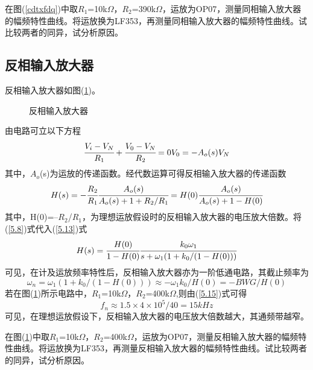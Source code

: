 \documentclass[a4paper]{article}
\begin{document}
在图(\ref{cdtxfdq})中取$R_1$=10k$\Omega$，$R_2$=390k$\Omega$，运放为OP07，测量同相输入放大器的幅频特性曲线。将运放换为LF353，再测量同相输入放大器的幅频特性曲线。试比较两者的同异，试分析原因。

\subsection{反相输入放大器}
反相输入放大器如图(\ref{cdfxfdq})。
\begin{figure}[!h]
\centering
{}
\caption{反相输入放大器}\label{cdfxfdq}
\end{figure}
由电路可立以下方程
\begin{equation}
\cfrac{V_i - V_N}{R_1} + \cfrac{V_0 - V_N}{R_2} = 0\\
V_0 = -A_o(s)V_N\label{5.12}
\end{equation}
其中，$A_o$(s)为运放的传递函数。经代数运算可得反相输入放大器的传递函数
\begin{equation}
H(s) = -\cfrac{R_2}{R_1}\cfrac{A_o(s)}{A_o(s)+1+R_2/R_1} = H(0)\cfrac{A_o(s)}{A_o(s)+1-H(0)}\label{5.13}
\end{equation}
其中，H(0)=–$R_2$/$R_1$，为理想运放假设时的反相输入放大器的电压放大倍数。将(\ref{5.8})式代入(\ref{5.13})式
\begin{equation}
H(s) = \cfrac{H(0)}{1-H(0)}\cfrac{k_0\omega_1}{s+\omega_1(1+k_0/(1-H(0)))}\label{5.14}
\end{equation}
可见，在计及运放频率特性后，反相输入放大器亦为一阶低通电路，其截止频率为
\begin{equation}
\omega_n = \omega_1(1+k_0/(1-H(0))) \approx -\omega_1k_0/H(0) = -BWG/H(0)\label{5.15}
\end{equation}
若在图(\ref{cdfxfdq})所示电路中，$R_1$=10k$\Omega$，$R_2$=400k$\Omega$,则由(\ref{5.15})式可得
\begin{equation}
f_n \approx 1.5\times 4\times 10^5/40 = 15kHz\label{5.16}
\end{equation}
可见，在理想运放假设下，反相输入放大器的电压放大倍数越大，其通频带越窄。

在图(\ref{cdfxfdq})中取$R_1$=10k$\Omega$，$R_2$=400k$\Omega$，运放为OP07，测量反相输入放大器的幅频特性曲线。将运放换为LF353，再测量反相输入放大器的幅频特性曲线。试比较两者的同异，试分析原因。
\end{document}
